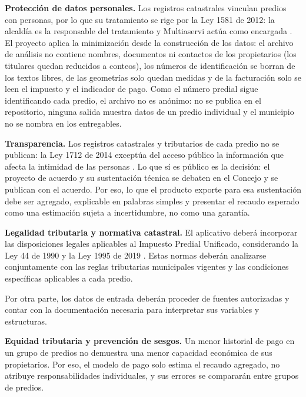 \documentclass[12pt,letterpaper]{article}
\begin{document}
\textbf{Protección de datos personales.} Los registros catastrales vinculan predios con personas, por lo que su tratamiento se rige por
la Ley 1581 de 2012: la alcaldía es la responsable del tratamiento y Multiaservi actúa como
encargada \cite{ley1581_2012}. El proyecto aplica la minimización desde la construcción de los
datos: el archivo de análisis no contiene nombres, documentos ni contactos de los propietarios
(los titulares quedan reducidos a conteos), los números de identificación se borran de los
textos libres, de las geometrías solo quedan medidas y de la facturación solo se leen el
impuesto y el indicador de pago. Como el número predial sigue identificando cada predio, el
archivo no es anónimo: no se publica en el repositorio, ninguna salida muestra datos de un
predio individual y el municipio no se nombra en los entregables.

\textbf{Transparencia.} Los registros catastrales y tributarios de cada predio no se publican: la Ley 1712 de 2014
exceptúa del acceso público la información que afecta la intimidad de las personas
\cite{ley1712_2014}. Lo que sí es público es la decisión: el proyecto de acuerdo y su
sustentación técnica se debaten en el Concejo y se publican con el acuerdo. Por eso, lo que
el producto exporte para esa sustentación debe ser agregado, explicable en palabras simples y
presentar el recaudo esperado como una estimación sujeta a incertidumbre, no como una
garantía.

\textbf{Legalidad tributaria y normativa catastral.} El aplicativo deberá incorporar las disposiciones legales aplicables al Impuesto Predial Unificado, 
considerando la Ley 44 de 1990 y la Ley 1995 de 2019 \cite{ley44,ley1995_2019}. Estas normas deberán analizarse conjuntamente con 
las reglas tributarias municipales vigentes y las condiciones específicas aplicables a cada predio.

Por otra parte, los datos de entrada deberán proceder de fuentes autorizadas y contar con la documentación
necesaria para interpretar sus variables y estructuras.

\textbf{Equidad tributaria y prevención de sesgos.} Un menor historial de pago en un grupo de
predios no demuestra una menor capacidad económica de sus propietarios. Por eso, el modelo de
pago solo estima el recaudo agregado, no atribuye responsabilidades individuales, y sus errores
se compararán entre grupos de predios.
\end{document}
